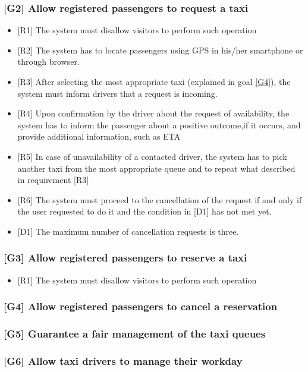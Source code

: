 \documentclass[a4paper,12pt]{article}%
\begin{document}
\subsubsection{{[}G2{]} Allow registered passengers to request a taxi}
\label{goal2}
\begin{itemize}
\item {[}R1{]} The system must disallow visitors to perform such operation
\item {[}R2{]} The system has to locate passengers using GPS in his/her smartphone or through browser.
\item {[}R3{]} After selecting the most appropriate taxi (explained in goal \hyperref[goal4]{[G4]}), the system must inform drivers that a request is incoming.
\item {[}R4{]} Upon confirmation by the driver about the request of availability, the system has to inform the passenger about a positive outcome,if it occurs, and provide additional information, such as ETA
\item {[}R5{]} In case of unavailability of a contacted driver, the system has to pick another taxi from the most appropriate queue and to repeat what described in requirement [R3]
\item {[}R6{]} The system must proceed to the cancellation of the request if and only if the user requested to do it and the condition in [D1] has not met yet.
\item {[}D1{]} The maximum number of cancellation requests is three.
\end{itemize}
\subsubsection{{[}G3{]} Allow registered passengers to reserve a taxi}
\label{goal3}
\begin{itemize}
\item {[}R1{]} The system must disallow visitors to perform such operation
\end{itemize}
\subsubsection{{[}G4{]} Allow registered passengers to cancel a reservation}
\label{goal4}
\subsubsection{{[}G5{]} Guarantee a fair management of the taxi queues}
\label{goal5}
\subsubsection{{[}G6{]} Allow taxi drivers to manage their workday}
\label{goal6}
\end{document}
